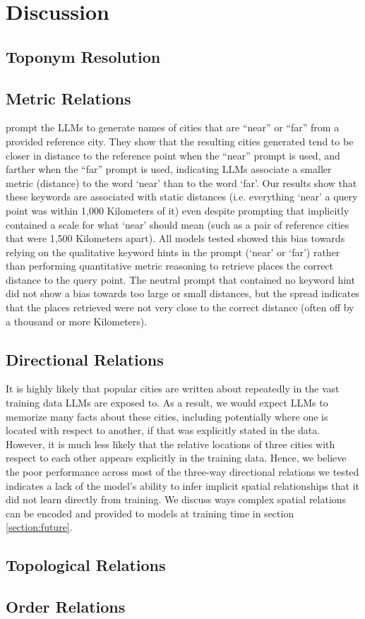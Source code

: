 \section{Discussion}
\label{section:discussion}

\subsection{Toponym Resolution}



\subsection{Metric Relations}

\citeauthor{Bhandari2023} prompt the LLMs to generate names of cities that are ``near'' or ``far'' from a provided reference city.
They show that the resulting cities generated tend to be closer in distance to the reference point when the ``near'' prompt is used, and farther when the ``far'' prompt is used, indicating LLMs associate a smaller metric (distance) to the word `near' than to the word `far'.
Our results show that these keywords are associated with static distances (i.e. everything `near' a query point was within 1,000 Kilometers of it) even despite prompting that implicitly contained a scale for what `near' should mean (such as a pair of reference cities that were 1,500 Kilometers apart).
All models tested showed this bias towards relying on the qualitative keyword hints in the prompt (`near' or `far') rather than performing quantitative metric reasoning to retrieve places the correct distance to the query point.
The neutral prompt that contained no keyword hint did not show a bias towards too large or small distances, but the spread indicates that the places retrieved were not very close to the correct distance (often off by a thousand or more Kilometers).


\subsection{Directional Relations}
It is highly likely that popular cities are written about repeatedly in the vast training data LLMs are exposed to.
As a result, we would expect LLMs to memorize many facts about these cities, including potentially where one is located with respect to another, if that was explicitly stated in the data.
However, it is much less likely that the relative locations of three cities with respect to each other appears explicitly in the training data.
Hence, we believe the poor performance across most of the three-way directional relations we tested indicates a lack of the model's ability to infer implicit spatial relationships that it did not learn directly from training.
We discuss ways complex spatial relations can be encoded and provided to models at training time in section \ref{section:future}.


\subsection{Topological Relations}



\subsection{Order Relations}
